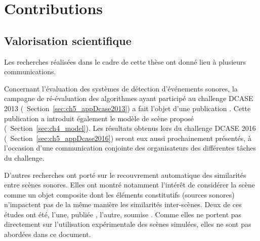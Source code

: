 

\section{Contributions}

\subsection{Valorisation scientifique}

Les recherches réalisées dans le cadre de cette thèse ont donné lieu à plusieurs communications.

Concernant l'évaluation des systèmes de détection d'événements sonores, la campagne de ré-évaluation des algorithmes ayant participé au challenge DCASE 2013 (\cf~Section~\ref{sec:ch5_appDcase2013}) a fait l'objet d'une publication \citep{lafay2016morphological}. Cette publication a introduit également le modèle de scène proposé (\cf~Section~\ref{sec:ch4_model}). Les résultats obtenus lors du challenge DCASE 2016 (\cf~Section~\ref{sec:ch5_appDcase2016}) seront eux aussi prochainement présentés, à l'occasion d'une communication conjointe des organisateurs des différentes tâches du challenge.

D'autres recherches ont porté sur le recouvrement automatique des similarités entre scènes sonores. Elles ont montré notamment l'intérêt de considérer la scène comme un objet composite dont les éléments constitutifs (sources sonores) n'impactent pas de la même manière les similarités inter-scènes. Deux de ces études ont été, l'une, publiée \citep{lagrange2015bag}, l'autre, soumise \citep{Lostenlen2016ScatteringObjet}. Comme elles ne portent pas directement sur l'utilisation expérimentale des scènes simulées, elles ne sont pas abordées dans ce document.

